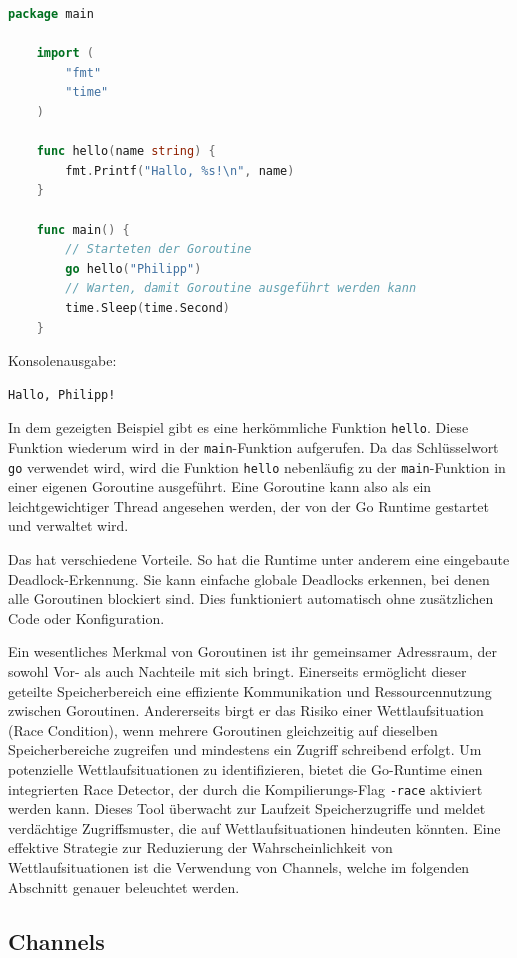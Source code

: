 \documentclass[fontsize=12pt,paper=a4,twoside=semi,parskip=half-,headsepline,headinclude]{scrreprt}
\begin{document}
\begin{lstlisting}[language=Go,extendedchars=true]
	package main
	
	import (
		"fmt"
		"time"
	)
	
	func hello(name string) {
		fmt.Printf("Hallo, %s!\n", name)
	}
	
	func main() {
		// Starteten der Goroutine
		go hello("Philipp")
		// Warten, damit Goroutine ausgeführt werden kann
		time.Sleep(time.Second)
	}
\end{lstlisting}
Konsolenausgabe:
\begin{lstlisting}[frame=shadowbox, rulecolor=\color{black}, backgroundcolor=\color{gray!10}]
	Hallo, Philipp!
\end{lstlisting}

In dem gezeigten Beispiel gibt es eine herkömmliche Funktion \texttt{hello}. Diese Funktion wiederum wird in der \texttt{main}-Funktion aufgerufen. Da das Schlüsselwort \texttt{go} verwendet wird, wird die Funktion \texttt{hello} nebenläufig zu der \texttt{main}-Funktion in einer eigenen Goroutine ausgeführt. Eine Goroutine kann also als ein leichtgewichtiger Thread angesehen werden, der von der Go Runtime gestartet und verwaltet wird. 

Das hat verschiedene Vorteile. So hat die Runtime unter anderem eine eingebaute Dead\-lock-Erkennung. Sie kann einfache globale Deadlocks erkennen, bei denen alle Goroutinen blockiert sind. Dies funktioniert automatisch ohne zusätzlichen Code oder Konfiguration.

Ein wesentliches Merkmal von Goroutinen ist ihr gemeinsamer Adressraum, der sowohl Vor- als auch Nachteile mit sich bringt. Einerseits ermöglicht dieser geteilte Speicherbereich eine effiziente Kommunikation und Ressourcennutzung zwischen Goroutinen. Andererseits birgt er das Risiko einer Wettlaufsituation (Race Condition), wenn mehrere Goroutinen gleichzeitig auf dieselben Speicherbereiche zugreifen und mindestens ein Zugriff schreibend erfolgt. Um potenzielle Wettlaufsituationen zu identifizieren, bietet die Go-Runtime einen integrierten Race Detector\cite{DataRace2024}, der durch die Kompilierungs-Flag \texttt{-race} aktiviert werden kann. Dieses Tool überwacht zur Laufzeit Speicherzugriffe und meldet verdächtige Zugriffsmuster, die auf Wettlaufsituationen hindeuten könnten. Eine effektive Strategie zur Reduzierung der Wahrscheinlichkeit von Wettlaufsituationen ist die Verwendung von Channels, welche im folgenden Abschnitt genauer beleuchtet werden.

\subsection{Channels}
\label{subsec:channel}
\end{document}
